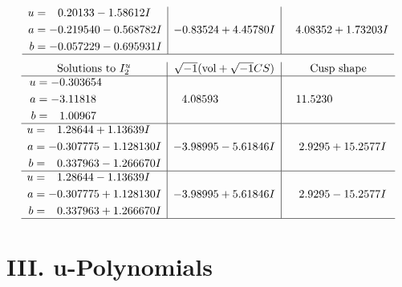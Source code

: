 \documentclass[1p]{elsarticle_modified}
\theoremstyle{definition}
\newcommand{\I}{\sqrt{-1}}
\begin{document}
$$\begin{array}{c|c|c}
\begin{aligned}
u &= \phantom{-}0.20133 - 1.58612 I \\
a &= -0.219540 - 0.568782 I \\
b &= -0.057229 - 0.695931 I\end{aligned}
 & -0.83524 + 4.45780 I & \phantom{-}4.08352 + 1.73203 I\\
 \hline 
 \end{array}$$\newpage$$\begin{array}{c|c|c}  
\text{Solutions to }I^u_{2}& \I (\text{vol} + \sqrt{-1}CS) & \text{Cusp shape}\\
 \hline 
\begin{aligned}
u &= -0.303654\phantom{ +0.000000I} \\
a &= -3.11818\phantom{ +0.000000I} \\
b &= \phantom{-}1.00967\phantom{ +0.000000I}\end{aligned}
 & \phantom{-}4.08593\phantom{ +0.000000I} & \phantom{-}11.5230\phantom{ +0.000000I} \\ \hline\begin{aligned}
u &= \phantom{-}1.28644 + 1.13639 I \\
a &= -0.307775 - 1.128130 I \\
b &= \phantom{-}0.337963 - 1.266670 I\end{aligned}
 & -3.98995 - 5.61846 I & \phantom{-}2.9295 + 15.2577 I \\ \hline\begin{aligned}
u &= \phantom{-}1.28644 - 1.13639 I \\
a &= -0.307775 + 1.128130 I \\
b &= \phantom{-}0.337963 + 1.266670 I\end{aligned}
 & -3.98995 + 5.61846 I & \phantom{-}2.9295 - 15.2577 I\\
 \hline 
 \end{array}$$\newpage
\newpage\renewcommand{\arraystretch}{1}
\centering \section*{ III. u-Polynomials}
\end{document}
